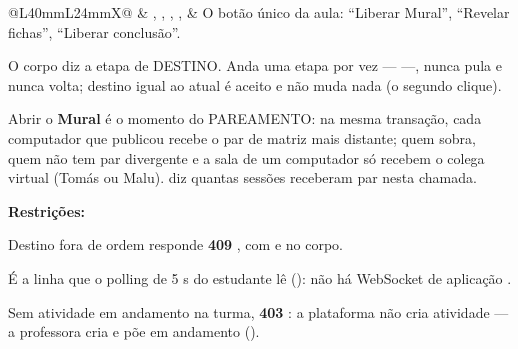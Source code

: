 \begin{tabularx}{\linewidth}{@{}L{40mm}L{24mm}X@{}}
 & , , , ,  & O botão único da aula: \enquote{Liberar Mural}, \enquote{Revelar fichas}, \enquote{Liberar conclusão}.\par O corpo diz a etapa de DESTINO. Anda uma etapa por vez ---  ---, nunca pula e nunca volta; destino igual ao atual é aceito e não muda nada (o segundo clique).\par Abrir o \textbf{Mural} é o momento do PAREAMENTO: na mesma transação, cada computador que publicou recebe o par de matriz mais distante; quem sobra, quem não tem par divergente e a sala de um computador só recebem o colega virtual (Tomás ou Malu).  diz quantas sessões receberam par nesta chamada.\par \textbf{Restrições:}\par \hspace*{1em}\textbullet{} Destino fora de ordem responde \textbf{409} , com  e  no corpo.\par \hspace*{1em}\textbullet{} É a linha que o polling de 5 s do estudante lê (): não há WebSocket de aplicação .\par \hspace*{1em}\textbullet{} Sem atividade em andamento na turma, \textbf{403} : a plataforma não cria atividade --- a professora cria e põe em andamento ().\\

\end{tabularx}
